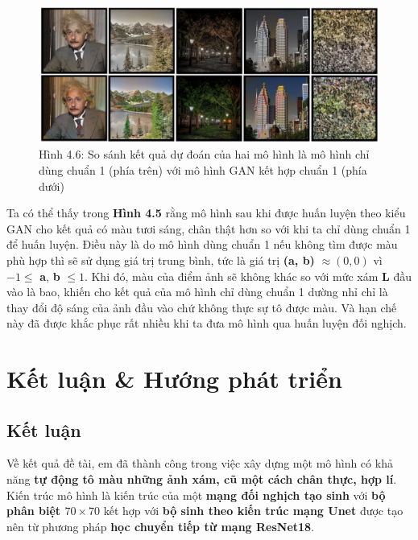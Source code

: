 \documentclass[a4paper]{article}
\begin{document}
\begin{figure}[h!]
\centering
\includegraphics[width=15cm]{images/4_3.PNG}
\caption{Hình 4.6: So sánh kết quả dự đoán của hai mô hình là mô hình chỉ dùng chuẩn 1 (phía trên) với mô hình GAN kết hợp chuẩn 1 (phía dưới)}
\end{figure}

\noindent
Ta có thể thấy trong \textbf{Hình 4.5} rằng mô hình sau khi được huấn luyện theo kiểu GAN cho kết quả có màu tươi sáng, chân thật hơn so với khi ta chỉ dùng chuẩn 1 để huấn luyện. Điều này là do mô hình dùng chuẩn 1 nếu không tìm được màu phù hợp thì sẽ sử dụng giá trị trung bình, tức là giá trị \textbf{(a, b)} $\approx (0, 0)$ vì $-1 \le$ \textbf{a}, \textbf{b} $\le 1$. Khi đó, màu của điểm ảnh sẽ không khác so với mức xám \textbf{L} đầu vào là bao, khiến cho kết quả của mô hình chỉ dùng chuẩn 1 dường nhỉ chỉ là thay đổi độ sáng của ảnh đầu vào chứ không thực sự tô được màu. Và hạn chế này đã được khắc phục rất nhiều khi ta đưa mô hình qua huấn luyện đối nghịch.

\section{Kết luận \& Hướng phát triển}

\subsection{Kết luận}
Về kết quả đề tài, em đã thành công trong việc xây dựng một mô hình có khả năng \textbf{tự động tô màu những ảnh xám, cũ một cách chân thực, hợp lí}. Kiến trúc mô hình là kiến trúc của một \textbf{mạng đối nghịch tạo sinh} với \textbf{bộ phân biệt $70 \times 70$} kết hợp với \textbf{bộ sinh theo kiến trúc mạng Unet} được tạo nên từ phương pháp \textbf{học chuyển tiếp từ mạng ResNet18}.\\
\end{document}
